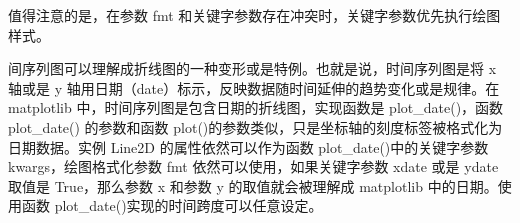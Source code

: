 值得注意的是，在参数 fmt 和关键字参数存在冲突时，关键字参数优先执行绘图样式。

间序列图可以理解成折线图的一种变形或是特例。也就是说，时间序列图是将 x 轴或是 y 轴用日期（date）标示，反映数据随时间延伸的趋势变化或是规律。在 matplotlib 中，时间序列图是包含日期的折线图，实现函数是 plot\_date()，函数 plot\_date() 的参数和函数 plot()的参数类似，只是坐标轴的刻度标签被格式化为日期数据。实例 Line2D 的属性依然可以作为函数 plot\_date()中的关键字参数 kwargs，绘图格式化参数 fmt 依然可以使用，如果关键字参数 xdate 或是 ydate 取值是 True，那么参数 x 和参数 y 的取值就会被理解成 matplotlib 中的日期。使用函数 plot\_date()实现的时间跨度可以任意设定。